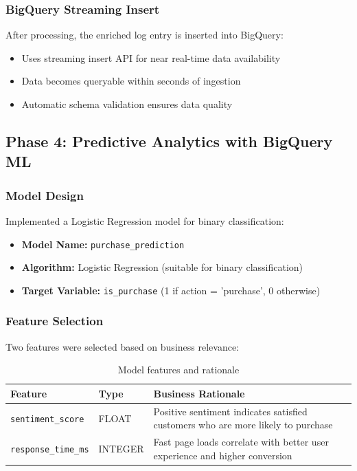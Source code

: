 \documentclass[12pt,a4paper]{article}
\begin{document}
\subsubsection{BigQuery Streaming Insert}

After processing, the enriched log entry is inserted into BigQuery:

\begin{itemize}
    \item Uses streaming insert API for near real-time data availability
    \item Data becomes queryable within seconds of ingestion
    \item Automatic schema validation ensures data quality
\end{itemize}

\subsection{Phase 4: Predictive Analytics with BigQuery ML}

\subsubsection{Model Design}

Implemented a Logistic Regression model for binary classification:

\begin{itemize}
    \item \textbf{Model Name:} \texttt{purchase\_prediction}
    \item \textbf{Algorithm:} Logistic Regression (suitable for binary classification)
    \item \textbf{Target Variable:} \texttt{is\_purchase} (1 if action = 'purchase', 0 otherwise)
\end{itemize}

\subsubsection{Feature Selection}

Two features were selected based on business relevance:

\begin{table}[H]
\centering
\begin{tabular}{|l|l|p{6cm}|}
\hline
\textbf{Feature} & \textbf{Type} & \textbf{Business Rationale} \\
\hline
\texttt{sentiment\_score} & FLOAT & Positive sentiment indicates satisfied customers who are more likely to purchase \\
\hline
\texttt{response\_time\_ms} & INTEGER & Fast page loads correlate with better user experience and higher conversion \\
\hline
\end{tabular}
\caption{Model features and rationale}
\end{table}
\end{document}
